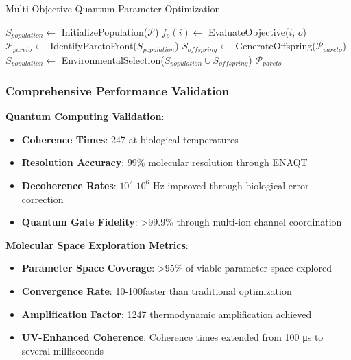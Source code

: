 \documentclass[11pt,a4paper]{article}
\begin{document}
\begin{algorithm}
\caption{Multi-Objective Quantum Parameter Optimization}
\begin{algorithmic}
    \State $S_{population} \leftarrow$ InitializePopulation($\mathcal{P}$)
                \State $f_o(i) \leftarrow$ EvaluateObjective($i$, $o$)
            \EndFor
        \EndFor
        \State $\mathcal{P}_{pareto} \leftarrow$ IdentifyParetoFront($S_{population}$)
        \State $S_{offspring} \leftarrow$ GenerateOffspring($\mathcal{P}_{pareto}$)
        \State $S_{population} \leftarrow$ EnvironmentalSelection($S_{population} \cup S_{offspring}$)
    \EndFor
    \State \Return $\mathcal{P}_{pareto}$
\EndProcedure
\end{algorithmic}
\end{algorithm}

\subsubsection{Comprehensive Performance Validation}

\textbf{Quantum Computing Validation}:
\begin{itemize}
\item \textbf{Coherence Times}: 247   at biological temperatures
\item \textbf{Resolution Accuracy}: 99\% molecular resolution through ENAQT
\item \textbf{Decoherence Rates}: $10^2$-$10^6$ Hz improved through biological error correction
\item \textbf{Quantum Gate Fidelity}: >99.9\% through multi-ion channel coordination
\end{itemize}

\textbf{Molecular Space Exploration Metrics}:
\begin{itemize}
\item \textbf{Parameter Space Coverage}: >95\% of viable parameter space explored
\item \textbf{Convergence Rate}: 10-100\times faster than traditional optimization
\item \textbf{Amplification Factor}: 1247 \times thermodynamic amplification achieved
\item \textbf{UV-Enhanced Coherence}: Coherence times extended from 100 μs to several milliseconds
\end{itemize}
\end{document}
